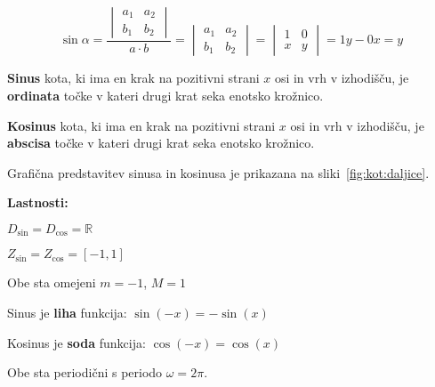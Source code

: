 \documentclass[a4paper,oneside,12pt,fleqn]{article}
\def\R{\ensuremath{\mathbb R}}
\newcommand\krat\cdot
\def\kos{\cos}
\numberwithin{equation}{section}
\newenvironment{enumerate*}%
{
\vspace{-12pt}%
\begin{enumerate}%
\setlength{\itemsep}{0pt}%
\setlength{\parskip}{2pt}}%
{\end{enumerate}}
\begin{document}
\begin{equation}
  \sin\alpha = \frac{\begin{vmatrix} a_1 & a_2 \\ b_1 & b_2 \end{vmatrix}}{a\krat b} =
  \begin{vmatrix} a_1 & a_2 \\ b_1 & b_2 \end{vmatrix} =
  \begin{vmatrix} 1 & 0 \\ x & y \end{vmatrix} = 1y - 0x = y
  \label{eq:kot:sindef}
\end{equation}


\textbf{Sinus} kota, ki ima en krak na pozitivni strani $x$ osi in vrh v izhodišču, je
\textbf{ordinata} točke v kateri drugi krat seka enotsko krožnico.

\textbf{Kosinus} kota, ki ima en krak na pozitivni strani $x$ osi in vrh v izhodišču, je
\textbf{abscisa} točke v kateri drugi krat seka enotsko krožnico.

Grafična predstavitev sinusa in kosinusa je prikazana na sliki~\ref{fig:kot:daljice}.

\textbf{Lastnosti:}
\begin{enumerate*}
  \item $D_{\sin} = D_{\cos} = \R$
  \item $Z_{\sin} = Z_{\cos} = [-1,1]$
  \item Obe sta omejeni $m = -1$, $M = 1$
  \item Sinus je \textbf{liha} funkcija: $\sin(-x) = -\sin(x)$
  \item Kosinus je \textbf{soda} funkcija: $\kos(-x) = \kos(x)$
  \item Obe sta periodični s periodo $\omega = 2\pi$.
\end{enumerate*}
\end{document}
